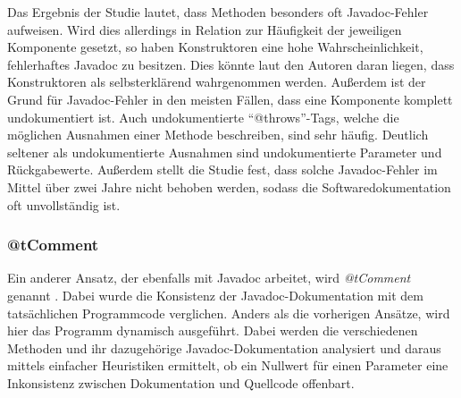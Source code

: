 Das Ergebnis der Studie lautet, dass Methoden besonders oft Javadoc-Fehler aufweisen. Wird dies allerdings in Relation zur Häufigkeit der jeweiligen Komponente gesetzt, so haben Konstruktoren eine hohe Wahrscheinlichkeit, fehlerhaftes Javadoc zu besitzen. Dies könnte laut den Autoren daran liegen, dass Konstruktoren als selbsterklärend wahrgenommen werden. Außerdem ist der Grund für Javadoc-Fehler in den meisten Fällen, dass eine Komponente komplett undokumentiert ist. Auch undokumentierte \enquote{@throws}-Tags, welche die möglichen Ausnahmen einer Methode beschreiben, sind sehr häufig. Deutlich seltener als undokumentierte Ausnahmen sind undokumentierte Parameter und Rückgabewerte. Außerdem stellt die Studie fest, dass solche Javadoc-Fehler im Mittel über zwei Jahre nicht behoben werden, sodass die Softwaredokumentation oft unvollständig ist. 

\subsubsection{@tComment}\label{@tComment}
Ein anderer Ansatz, der ebenfalls mit Javadoc arbeitet, wird \textit{@tComment} genannt \cite[S.~1ff.]{@tComment:TestingJavadocCommentstoDetectComment-CodeInconsistencies}. Dabei wurde die Konsistenz der Javadoc-Dokumentation mit dem tatsächlichen Programmcode verglichen. Anders als die vorherigen Ansätze, wird hier das Programm dynamisch ausgeführt. Dabei werden die verschiedenen Methoden und ihr dazugehörige Javadoc-Dokumentation analysiert und daraus mittels einfacher Heuristiken ermittelt, ob ein  Nullwert für einen Parameter eine Inkonsistenz zwischen Dokumentation und Quellcode offenbart.

